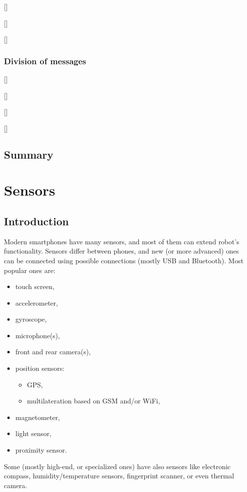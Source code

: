 \documentclass[]{mgr} %
\begin{document}
[]

[]

[]

\clearpage

\subsection{Division of messages}

[]

[]

[]

[]


\section{Summary}

\chapter{Sensors}

\section{Introduction}
Modern smartphones have many sensors, and most of them can extend robot's
functionality. Sensors differ between phones, and new (or more advanced) ones can
be connected using possible connections (mostly USB and Bluetooth).
Most popular ones are:
\begin{itemize}
  \item touch screen,
  \item accelerometer,
  \item gyroscope,
  \item microphone(s),
  \item front and rear camera(s),
  \item position sensors:
  \begin{itemize}
    \item GPS,
    \item multilateration based on GSM and/or WiFi,
  \end{itemize}
  \item magnetometer,
  \item light sensor,
  \item proximity sensor.
\end{itemize}
Some (mostly high-end, or specialized ones) have also sensors like electronic
compass, humidity/temperature sensors, fingerprint scanner, or even thermal
camera.
\end{document}
